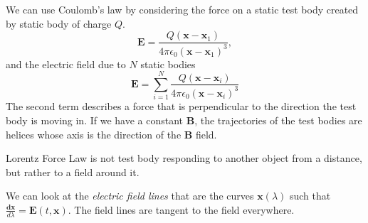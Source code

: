 \begin{eg}
    We can use Coulomb's law by considering the force on a static test body created by static body of charge \(Q\).
    \[
        \mathbf{E}  = \frac{Q (\mathbf{x} - \mathbf{x} _1)}{4\pi \epsilon_0 (\mathbf{x} - \mathbf{x} _1)^3},
    \]
    and the electric field due to \(N\) static bodies
    \[
        \mathbf{E} = \sum\limits_{i=1}^{N}\frac{Q (\mathbf{x} - \mathbf{x} _i)}{4\pi \epsilon_0 (\mathbf{x} - \mathbf{x} _i)^3}
    \] 
    The second term describes a force that is perpendicular to the direction the test body is moving in. If we have a constant \(\mathbf{B}\), the trajectories of the test bodies are helices whose axis is the direction of the \(\mathbf{B} \) field.

    Lorentz Force Law is not test body responding to another object from a distance, but rather to a field around it.

    We can look at the \textit{electric field lines} that are the curves \(\mathbf{x} (\lambda)\) such that \(\frac{\mathbf{dx}}{d\lambda} = \mathbf{E} (t, \mathbf{x} )\). The field lines are tangent to the field everywhere.
\end{eg}
